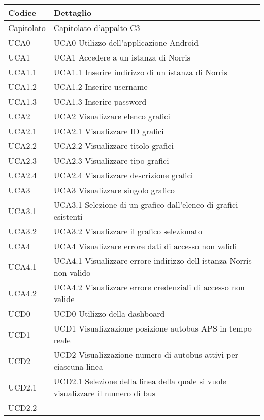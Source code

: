 
				\begin{longtabu} spread 1cm [c]{|X[-1,l]|X[-1,l]|}
					\hline
					\rowfont{\bf \centering}
					Codice &
					Dettaglio \\
					\hline
					\endhead
					
					Capitolato &
                Capitolato d'appalto C3\\\hline UCA0 &
                UCA0 Utilizzo dell'applicazione Android\\\hline UCA1 &
                UCA1 Accedere a un istanza di Norris\\\hline UCA1.1 &
                UCA1.1 Inserire indirizzo di un istanza di Norris\\\hline UCA1.2 &
                UCA1.2 Inserire username\\\hline UCA1.3 &
                UCA1.3 Inserire password\\\hline UCA2 &
                UCA2 Visualizzare elenco grafici\\\hline UCA2.1 &
                UCA2.1 Visualizzare ID grafici\\\hline UCA2.2 &
                UCA2.2 Visualizzare titolo grafici\\\hline UCA2.3 &
                UCA2.3 Visualizzare tipo grafici\\\hline UCA2.4 &
                UCA2.4 Visualizzare descrizione grafici\\\hline UCA3 &
                UCA3 Visualizzare singolo grafico\\\hline UCA3.1 &
                UCA3.1 Selezione di un grafico dall'elenco di grafici esistenti\\\hline UCA3.2 &
                UCA3.2 Visualizzare il grafico selezionato\\\hline UCA4 &
                UCA4 Visualizzare errore dati di accesso non validi\\\hline UCA4.1 &
                UCA4.1 Visualizzare errore indirizzo dell istanza Norris non valido\\\hline UCA4.2 &
                UCA4.2 Visualizzare errore credenziali di accesso non valide\\\hline UCD0 &
                UCD0 Utilizzo della dashboard\\\hline UCD1 &
                UCD1 Visualizzazione posizione autobus APS in tempo reale\\\hline UCD2 &
                UCD2 Visualizzazione numero di autobus attivi per ciascuna linea\\\hline UCD2.1 &
                UCD2.1 Selezione della linea della quale si vuole visualizzare il numero di bus\\\hline UCD2.2 &

\end{longtabu}
